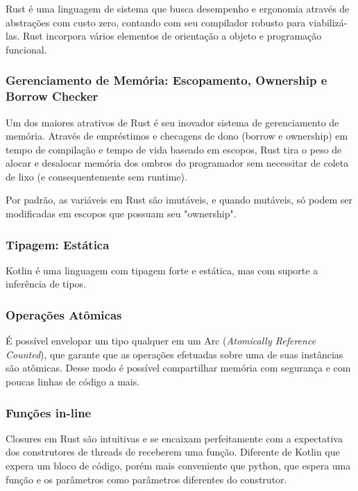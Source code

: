 \documentclass{article}
\begin{document}
Rust é uma linguagem de sistema que busca desempenho e ergonomia através de abstrações com custo zero, contando com seu compilador robusto para viabilizá-las. Rust incorpora vários elementos de orientação a objeto e programação funcional.

\subsubsection{Gerenciamento de Memória: Escopamento, Ownership e Borrow Checker}
\label{sssec:rust memoria}

Um dos maiores atrativos de Rust é seu inovador sistema de gerenciamento de memória. Através de empréstimos e checagens de dono (borrow e ownership) em tempo de compilação e tempo de vida baseado em escopos, Rust tira o peso de alocar e desalocar memória dos ombros do programador sem necessitar de coleta de lixo (e consequentemente sem runtime).

Por padrão, as variáveis em Rust são imutáveis, e quando mutáveis, só podem ser modificadas em escopos que possuam seu "ownership".

\subsubsection{Tipagem: Estática}
\label{sssec:rust tipagem}

Kotlin é uma linguagem com tipagem forte e estática, mas com suporte a inferência de tipos.

\subsubsection{Operações Atômicas}
\label{sssec:rust operacoes atomicas}

É possível envelopar um tipo qualquer em um Arc (\emph{Atomically Reference Counted}), que garante que as operações efetuadas sobre uma de suas instâncias são atômicas. Desse modo é possível compartilhar memória com segurança e com poucas linhas de código a mais.

\subsubsection{Funções in-line}
\label{sssec:rust funcoes inline}

Closures em Rust são intuitivas e se encaixam perfeitamente com a expectativa dos construtores de threads de receberem uma função. Diferente de Kotlin que expera um bloco de código, porém mais conveniente que python, que espera uma função e os parâmetros como parâmetros diferentes do construtor.
\end{document}
